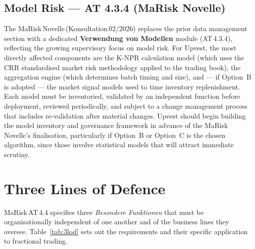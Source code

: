 \documentclass[12pt,a4paper]{report}
\begin{document}
\subsection{Model Risk --- AT 4.3.4 (MaRisk Novelle)}

The MaRisk\,Novelle\,(Konsultation\,02/2026) replaces the prior data management
section with a dedicated \textbf{Verwendung von Modellen} module (AT\,4.3.4),
reflecting the growing supervisory focus on model risk. For Upvest, the most
directly affected components are the K-NPR calculation model (which uses the CRR
standardised market risk methodology applied to the trading book), the
aggregation engine (which determines batch timing and size), and --- if Option~B
is adopted --- the market signal models used to time inventory replenishment.
Each model must be inventoried, validated by an independent function before
deployment, reviewed periodically, and subject to a change management process
that includes re-validation after material changes. Upvest should begin building
the model inventory and governance framework in advance of the MaRisk Novelle's
finalisation, particularly if Option~B or Option~C is the chosen algorithm,
since those involve statistical models that will attract immediate scrutiny.

\section{Three Lines of Defence}
\label{sec:3lod}

MaRisk\,AT\,4.4 specifies three \textit{Besondere Funktionen} that must be
organisationally independent of one another and of the business lines they
oversee. Table~\ref{tab:3lod} sets out the requirements and their specific
application to fractional trading.
\end{document}
